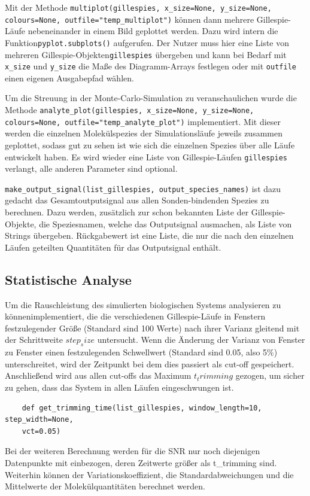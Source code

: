 Mit der Methode \texttt{multiplot(gillespies, x\_size=None, y\_size=None,\newline
	colours=None, outfile="temp\_multiplot")} können dann mehrere Gillespie-Läufe nebeneinander in einem Bild geplottet werden. Dazu wird intern die Funktion\newline \texttt{pyplot.subplots()} aufgerufen. Der Nutzer muss hier eine Liste von mehreren Gillespie-Objekten\newline \texttt{gillespies} übergeben und kann bei Bedarf mit \texttt{x\_size} und \texttt{y\_size} die Maße des Diagramm-Arrays festlegen oder mit \texttt{outfile} einen eigenen Ausgabepfad wählen.\par

Um die Streuung in der Monte-Carlo-Simulation zu veranschaulichen wurde die Methode \texttt{analyte\_plot(gillespies, x\_size=None, y\_size=None, colours=None, outfile="temp\_analyte\_plot")} implementiert. Mit dieser werden die einzelnen Molekülspezies der Simulationsläufe jeweils zusammen geplottet, sodass gut zu sehen ist wie sich die einzelnen Spezies über alle Läufe entwickelt haben. Es wird wieder eine Liste von Gillespie-Läufen \texttt{gillespies} verlangt, alle anderen Parameter sind optional.\par

\texttt{make\_output\_signal(list\_gillespies, output\_species\_names)} ist dazu gedacht das Gesamtoutputsignal aus allen Sonden-bindenden Spezies zu berechnen. Dazu werden, zusätzlich zur schon bekannten Liste der Gillespie-Objekte, die Speziesnamen, welche das Outputsignal ausmachen, als Liste von Strings übergeben. Rückgabewert ist eine Liste, die nur die nach den einzelnen Läufen geteilten Quantitäten für das Outputsignal enthält.

\subsection{Statistische Analyse}
Um die Rauschleistung des simulierten biologischen Systems analysieren zu könnenimplementiert, die die verschiedenen Gillespie-Läufe in Fenstern festzulegender Größe (Standard sind 100 Werte) nach ihrer Varianz gleitend mit der Schrittweite $step_size$ untersucht. Wenn die Änderung der Varianz von Fenster zu Fenster einen festzulegenden Schwellwert (Standard sind 0.05, also 5\%) unterschreitet, wird der Zeitpunkt bei dem dies passiert als cut-off gespeichert. Anschließend wird aus allen cut-offs das Maximum $t_trimming$ gezogen, um sicher zu gehen, dass das System in allen Läufen eingeschwungen ist.
\begin{verbatim}
	def get_trimming_time(list_gillespies, window_length=10, step_width=None,
	vct=0.05)
\end{verbatim}

Bei der weiteren Berechnung werden für die SNR nur noch diejenigen Datenpunkte mit einbezogen, deren Zeitwerte größer als t\_trimming sind.
Weiterhin können der Variationskoeffizient, die Standardabweichungen und die Mittelwerte der Molekülquantitäten berechnet werden.
